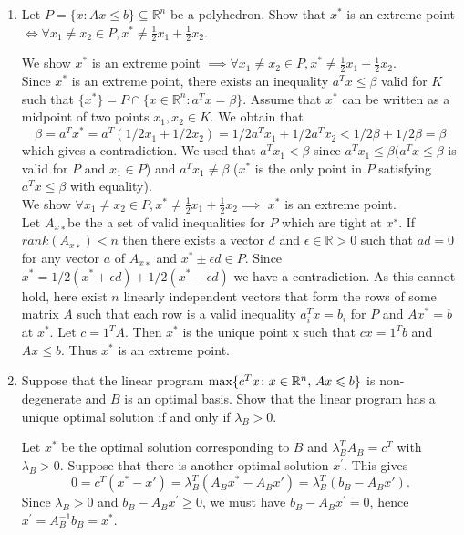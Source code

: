 \documentclass[11pt]{article}
\institute{\'Ecole Polytechnique F\'ed\'erale de Lausanne}
\newcommand{\setR}{\mathbb{R}}
\renewcommand{\leq}{\leqslant}
\renewcommand{\geq}{\geqslant}
\begin{document}
\makeheader

\begin{enumerate}[1)]
\item Let $P = \{x: A x \leq b\} \subseteq \setR^n$ be a polyhedron. Show that $x^\ast$ is an extreme point $\iff \forall x_1 \neq x_2 \in P, x^\ast \neq \frac{1}{2}x_1 + \frac{1}{2}x_2$. 


\begin{solution}
We show $x^\ast$ is an extreme point $\implies \forall x_1 \neq x_2 \in P, x^\ast \neq \frac{1}{2}x_1 + \frac{1}{2}x_2$.
\\

Since $x^\ast$ is an extreme point, there exists an inequality $a^T x≤β$ valid for $K$ such that $\{x^\ast\}= P∩\{x∈
\setR^n : a^T x= β\}$. Assume that $x^\ast$ can be written as a midpoint of two points $x_1,x_2∈K$. We obtain
that
$$β= a^T x^\ast= a^T (1/2x_1+ 1/2x_2) = 1/2a^T x_1+ 1/2a^T x_2 <1/2β+ 1/2 β= β$$
which gives a contradiction. We used that $a^T x_1 < β$ since $a^T x_1 ≤β (a^T x ≤β$ is valid for $P$ and $x_1 ∈P$) and $a^T x_1\neq β$ ($x^\ast$ is the only point in $P$ satisfying $a^T x≤β$ with equality).\\



We show $\forall x_1 \neq x_2 \in P, x^\ast \neq \frac{1}{2}x_1 + \frac{1}{2}x_2 \implies $ $x^\ast$ is an extreme point. \\


Let $A_{x∗} $be the a set of valid inequalities for $P$ which
are tight at $x^∗$. If $rank(A_{x∗} ) < n$ then there exists a vector $d$ and $\epsilon ∈\setR>0$ such that $ad = 0$ for
any vector $a$ of $A_{x∗}$ and $x^\ast ±\epsilon d \in P$. Since $x^\ast=  1/2(x^\ast + \epsilon d) + 1/2(x^\ast
−\epsilon d)$ we have a contradiction. As this cannot hold, here exist $n$ linearly independent vectors that form the rows of some matrix $A$ such that each row is a valid inequality $a_i^T x = b_i$ for $P$ and $Ax^\ast = b$ at $x^\ast$. Let $c= 1^T A$. Then $x^\ast$ is the unique point x such that $cx= 1^T b$ and $Ax≤b$. Thus $x^\ast$ is an extreme point.

\end{solution}


\item Suppose that the linear program $\max \{c^Tx \colon x \in \R^n, \, Ax \leq b\}$ is non-degenerate and $B$ is an optimal basis. Show that the linear program has a unique optimal solution if and only if $\lambda_B>0$. 


\begin{solution}
Let $x^*$ be the optimal solution corresponding to $B$ and $\lambda_B^TA_B = c^T$ with $\lambda_B>0$. Suppose that there is another optimal solution $x^\prime$. This gives
$$0 = c^T(x^*-x') = \lambda_B^T(A_B x^* - A_Bx') = \lambda_B^T(b_B - A_Bx').$$
Since $\lambda_B> 0$ and $b_B - A_B x^\prime \geq 0$, we must have $b_B - A_B x^\prime = 0$, hence $x^\prime = A_B^{-1} b_B = x^*$.



\end{solution}
\end{enumerate}
\end{document}
